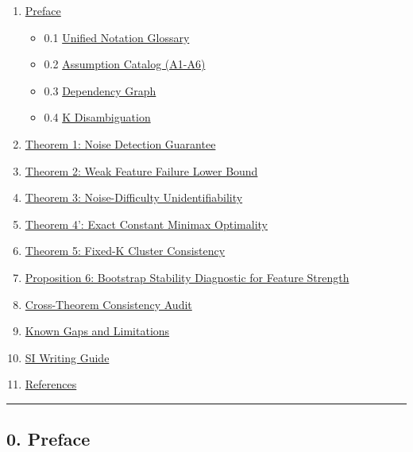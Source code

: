\documentclass[
  12pt,
]{ctexart}
\providecommand{\tightlist}{%
  \setlength{\itemsep}{0pt}\setlength{\parskip}{0pt}}
\begin{document}
\begin{enumerate}
\def\labelenumi{\arabic{enumi}.}
\setcounter{enumi}{-1}
\tightlist
\item
  \hyperref[0-preface]{Preface}

  \begin{itemize}
  \tightlist
  \item
    0.1 \hyperref[01-unified-notation-glossary]{Unified Notation
    Glossary}
  \item
    0.2 \hyperref[02-assumption-catalog-a1-a6]{Assumption Catalog
    (A1-A6)}
  \item
    0.3 \hyperref[03-dependency-graph]{Dependency Graph}
  \item
    0.4 \hyperref[04-k-disambiguation]{K Disambiguation}
  \end{itemize}
\item
  \hyperref[1-theorem-1-noise-detection-guarantee]{Theorem 1: Noise
  Detection Guarantee}
\item
  \hyperref[2-theorem-2-weak-feature-failure-lower-bound]{Theorem 2:
  Weak Feature Failure Lower Bound}
\item
  \hyperref[3-theorem-3-noise-difficulty-unidentifiability]{Theorem 3:
  Noise-Difficulty Unidentifiability}
\item
  \hyperref[4-theorem-4-exact-constant-minimax-optimality]{Theorem 4':
  Exact Constant Minimax Optimality}
\item
  \hyperref[5-theorem-5-fixed-k-cluster-consistency]{Theorem 5: Fixed-K
  Cluster Consistency}
\item
  \hyperref[6-proposition-6-bootstrap-stability-diagnostic-for-feature-strength]{Proposition
  6: Bootstrap Stability Diagnostic for Feature Strength}
\item
  \hyperref[7-cross-theorem-consistency-audit]{Cross-Theorem Consistency
  Audit}
\item
  \hyperref[8-known-gaps-and-limitations]{Known Gaps and Limitations}
\item
  \hyperref[9-si-writing-guide]{SI Writing Guide}
\item
  \hyperref[10-references]{References}
\end{enumerate}

\begin{center}\rule{0.5\linewidth}{0.5pt}\end{center}

\subsection{0. Preface}\label{preface}
\end{document}
